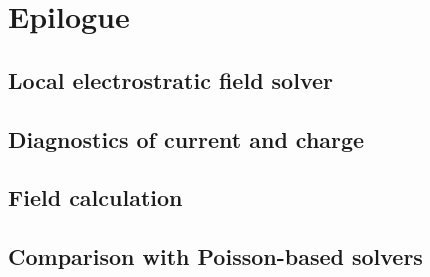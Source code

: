 \chapter{Epilogue}

	\section{Local electrostratic field solver}

  \section{Diagnostics of current and charge}
  
  \section{Field calculation}

  \section{Comparison with Poisson-based solvers}
